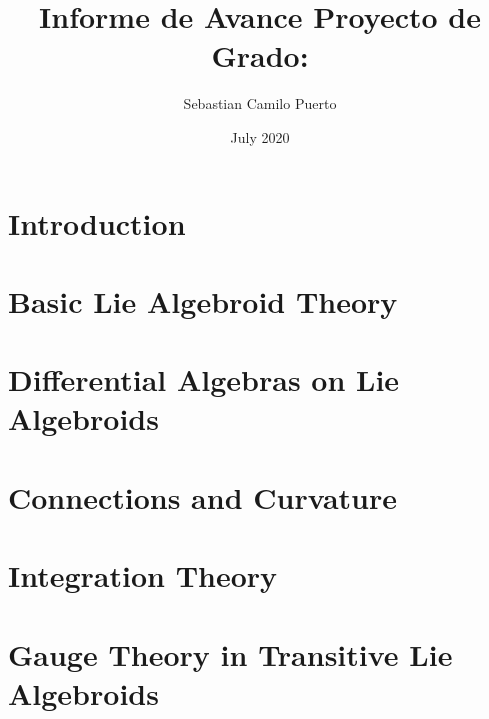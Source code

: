 \documentclass{article}
\title{Informe de Avance Proyecto de Grado: }
\author{Sebastian Camilo Puerto}
\date{July 2020}
\begin{document}
\maketitle

\setcounter{section}{-1}
\section{Introduction}\label{chp:intro}

\section{Basic Lie Algebroid Theory}\label{chp:basicLie}

\section{Differential Algebras on Lie Algebroids}\label{chp:diffStruc}

\section{Connections and Curvature}\label{chp:connections}

\section{Integration Theory}\label{chp:integration}

\section{Gauge Theory in Transitive Lie Algebroids}\label{chp:gaugeTh}

\tableofcontents

\end{document}

